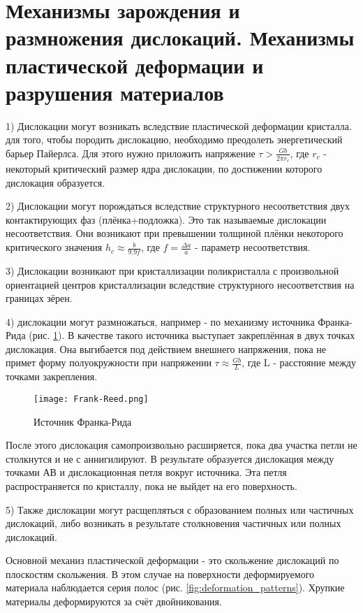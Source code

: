 \section{Механизмы зарождения и размножения дислокаций. Механизмы
пластической деформации и разрушения материалов} 
1) Дислокации могут возникать вследствие пластической деформации кристалла. для того, чтобы породить дислокацию, необходимо преодолеть энергетический барьер Пайерлса. Для этого нужно приложить напряжение $\tau>\frac{Gb}{2\pi r_c}$, где $r_c$ - некоторый критический размер ядра дислокации, по достижении которого дислокация образуется.
\par 2) Дислокации могут порождаться вследствие структурного несоответствия двух контактирующих фаз (плёнка+подложка). Это так называемые дислокации несоответствия. Они возникают при превышении толщиной плёнки некоторого критического значения $h_c\approx \frac{b}{9.9 f}$, где $f=\frac{\Delta a}{a}$ - параметр несоответствия.
\par
3) Дислокации возникают при кристаллизации поликристалла с произвольной ориентацией центров кристаллизации вследствие структурного несоответствия на границах зёрен.
\par 4) дислокации могут размножаться, например -  по механизму источника Франка-Рида (рис. \ref{fig:Frank-Reed}). В качестве такого источника выступает закреплённая в двух точках дислокация. Она выгибается под действием внешнего напряжения, пока не примет форму полуокружности при напряжении $\tau \approx \frac{Gb}{L}$, где L - расстояние между точками закрепления.
\begin{figure}[h!]
\centering
\texttt{[image: Frank-Reed.png]}\caption{Источник Франка-Рида} \label{fig:Frank-Reed}
\end{figure} 
После этого дислокация самопроизвольно расширяется, пока два участка петли не столкнутся и не с аннигилируют. В результате образуется дислокация между точками АВ и дислокационная петля вокруг источника. Эта петля распространяется по кристаллу, пока не выйдет на его поверхность.
\par
5) Также дислокации могут расщепляться с образованием полных или частичных дислокаций, либо возникать в результате столкновения частичных или полных дислокаций.
\par
Основной механиз пластической деформации - это скольжение дислокаций по плоскостям скольжения. В этом случае на поверхности деформируемого материала наблюдается серия полос (рис. \ref{fig:deformation_patterns}). Хрупкие материалы деформируются за счёт двойникования.
